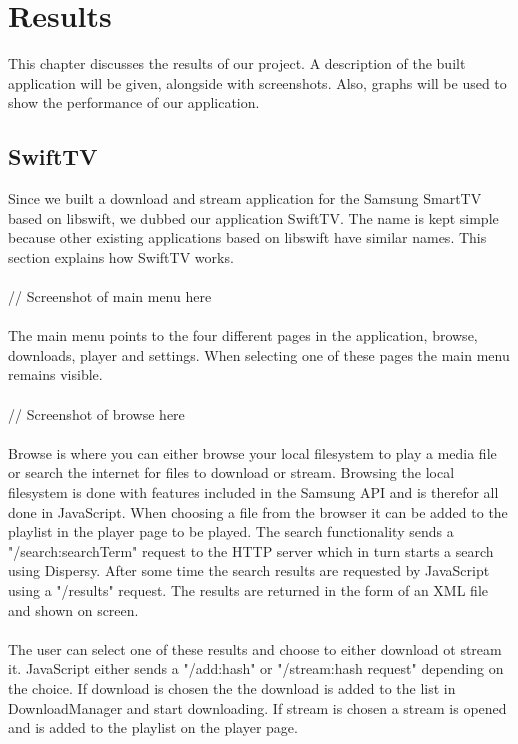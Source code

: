 \chapter{Results}
This chapter discusses the results of our project. A description of the built application will be given, alongside with screenshots.
Also, graphs will be used to show the performance of our application.

\section{SwiftTV}
Since we built a download and stream application for the Samsung SmartTV based on libswift, we dubbed our application SwiftTV.
The name is kept simple because other existing applications based on libswift have similar names. This section explains how SwiftTV works.
\\\\
// Screenshot of main menu here 
\\\\
The main menu points to the four different pages in the application, browse, downloads, player and settings. When selecting one of these pages the main menu remains visible.
\\\\
// Screenshot of browse here 
\\\\
Browse is where you can either browse your local filesystem to play a media file or search the internet for files to download or stream. Browsing the local filesystem is done with features included in the Samsung API and is therefor all done in JavaScript. When choosing a file from the browser it can be added to the playlist in the player page to be played. The search functionality sends a "/search:searchTerm" request to the HTTP server which in turn starts a search using Dispersy. After some time the search results are requested by JavaScript using a "/results" request. The results are returned in the form of an XML file and shown on screen. 
\\\\
The user can select one of these results and choose to either download ot stream it. JavaScript either sends a "/add:hash" or "/stream:hash request" depending on the choice. If download is chosen the the download is added to the list in DownloadManager and start downloading. If stream is chosen a stream is opened and is added to the playlist on the player page.
\\\\
